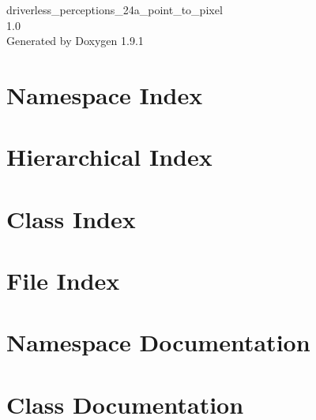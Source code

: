 \let\mypdfximage\pdfximage\def\pdfximage{\immediate\mypdfximage}\documentclass[twoside]{book}
\newcommand{\+}{\discretionary{\mbox{\scriptsize$\hookleftarrow$}}{}{}}
\newcommand{\clearemptydoublepage}{%
  \newpage{\pagestyle{empty}\cleardoublepage}%
}
\begin{document}
\raggedbottom

\hypersetup{pageanchor=false,
             bookmarksnumbered=true,
             pdfencoding=unicode
            }
\begin{titlepage}
\vspace*{7cm}
\begin{center}%
{\Large driverless\+\_\+perceptions\+\_\+24a\+\_\+point\+\_\+to\+\_\+pixel \\[1ex]\large 1.\+0 }\\
\vspace*{1cm}
{\large Generated by Doxygen 1.9.1}\\
\end{center}
\end{titlepage}
\clearemptydoublepage
{}
\tableofcontents
\clearemptydoublepage
{}
\hypersetup{pageanchor=true}

\chapter{Namespace Index}

\chapter{Hierarchical Index}

\chapter{Class Index}

\chapter{File Index}

\chapter{Namespace Documentation}










\chapter{Class Documentation}




















\end{document}
